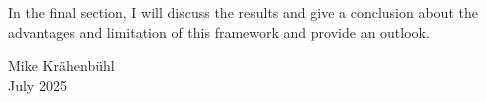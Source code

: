 \documentclass[11pt,a4paper,twoside]{book}
\begin{document}
In the final section, I will discuss the results and give a conclusion about the 
advantages and limitation of this framework and provide an outlook.

\bigskip

\begin{flushright}
  Mike Kr{\"a}henb{\"u}hl\\
  July 2025
\end{flushright}


\cleardoublepage
{}




















\cleardoublepage
{}
{}


 


\cleardoublepage
\end{document}
